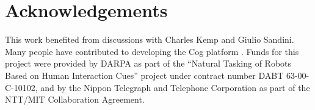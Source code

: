 
\iflong
\section*{Acknowledgements}
\else
\begin{Acknowledgment}
\fi

This work benefited from discussions with Charles Kemp and Giulio
Sandini.  Many people have contributed to developing the Cog platform
\cite{brooks99cog}.  Funds for this project were provided by DARPA as
part of the ``Natural Tasking of Robots Based on Human Interaction
Cues'' project under contract number DABT 63-00-C-10102, and by the
Nippon Telegraph and Telephone Corporation as part of the NTT/MIT
Collaboration Agreement.

\iflong
\else
\end{Acknowledgment}
\fi
